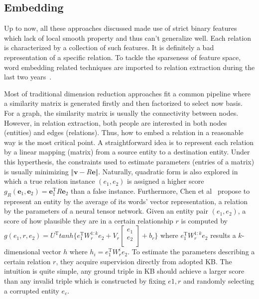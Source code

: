 \documentclass[10pt]{article} %
\theoremstyle{definition}
\theoremstyle{definition}
\begin{document}
\subsection{Embedding}
Up to now, all these approaches discussed made use of strict binary features which lack of local smooth property and thus can't generalize well. 
Each relation is characterized by a collection of such features. 
It is definitely a bad representation of a specific relation. 
To tackle the sparseness of feature space, word embedding related techniques are imported to relation extraction during the last two years~\cite{cdq, embedding, embedding1}. 



Most of traditional dimension reduction approaches fit a common pipeline where a similarity matrix is generated firstly and then factorized to select now basis. 
For a graph, the similarity matrix is usually the connectivity between nodes. 
However, in relation extraction, both people are interested in both nodes (entities) and edges (relations). 
Thus, how to embed a relation in a reasonable way is the most critical point. 
A straightforward idea is to represent each relation by a linear mapping (matrix) from a source entity to a destination entity. 
Under this hyperthesis, the constraints used to estimate parameters (entries of a matrix) is usually minimizing $\Vert\mathbf{v}-R\mathbf{e}\Vert$. 
Naturally, quadratic form is also explored in which a true relation instance $(e_1, e_2)$ is assigned a higher score $g_{R}(\mathbf{e}_1, \mathbf{e}_2)=\mathbf{e}_{1}^{\mathrm{T}}R\mathbf{e}_2$ than a false instance. 
Furthermore, Chen et al~\cite{cdq} propose to represent an entity by the average of its words' vector representation, a relation by the parameters of a neural tensor network. 
Given an entity pair $(e_1, e_2)$, a score of how plausible they are in a certain relationship $r$ is computed by 
$g(e_1, r, e_2)=U^{\mathrm{T}}tanh\{e_{1}^{\mathrm{T}}W_{r}^{1:k}e_2+V_{r}\begin{bmatrix}e_1\\e_2\\\end{bmatrix}+b_{r}\}$ where 
$e_{1}^{\mathrm{T}}W_{r}^{1:k}e_{2}$ results a $k$-dimensional vector $h$ where 
$h_{i}=e_{1}^{\mathrm{T}}W_{r}^{i}e_2$. 
To estimate the parameters describing a certain relation $r$, they acquire supervision directly from adopted KB. 
The intuition is quite simple, any ground triple in KB should achieve a larger score than any invalid triple which 
is constructed by fixing $e1, r$ and randomly selecting a corrupted entity $e_c$. 
\end{document}
